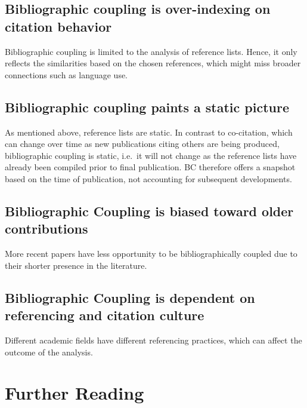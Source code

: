 \documentclass[
  letterpaper,
]{scrreprt}
\begin{document}
\subsection{Bibliographic coupling is over-indexing on citation
behavior}\label{bibliographic-coupling-is-over-indexing-on-citation-behavior}

Bibliographic coupling is limited to the analysis of reference lists.
Hence, it only reflects the similarities based on the chosen references,
which might miss broader connections such as language use.

\subsection{Bibliographic coupling paints a static
picture}\label{bibliographic-coupling-paints-a-static-picture}

As mentioned above, reference lists are static. In contrast to
co-citation, which can change over time as new publications citing
others are being produced, bibliographic coupling is static, i.e.~it
will not change as the reference lists have already been compiled prior
to final publication. BC therefore offers a snapshot based on the time
of publication, not accounting for subsequent developments.

\subsection{Bibliographic Coupling is biased toward older
contributions}\label{bibliographic-coupling-is-biased-toward-older-contributions}

More recent papers have less opportunity to be bibliographically coupled
due to their shorter presence in the literature.

\subsection{Bibliographic Coupling is dependent on referencing and
citation
culture}\label{bibliographic-coupling-is-dependent-on-referencing-and-citation-culture}

Different academic fields have different referencing practices, which
can affect the outcome of the analysis.

\section{Further Reading}\label{further-reading-12}
\end{document}
